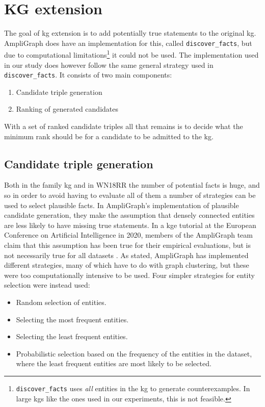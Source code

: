 


\newpage

\section{KG extension}

The goal of \gls{kg} extension is to add potentially true statements to the original \gls{kg}. AmpliGraph does have an implementation for this, called \texttt{discover\_facts}, but due to computational limitations\footnote{\texttt{discover\_facts} uses \textit{all} entities in the \gls{kg} to generate counterexamples. In large \glspl{kg} like the ones used in our experiments, this is not feasible.} it could not be used.
The implementation used in our study does however follow the same general strategy used in \texttt{discover\_facts}. It consists of two main components:
\begin{enumerate}
    \item Candidate triple generation
    \item Ranking of generated candidates
\end{enumerate}
With a set of ranked candidate triples all that remains is to decide what the minimum rank should be for a candidate to be admitted to the \gls{kg}.


\subsection{Candidate triple generation}
\label{canidate_triple_generation}
Both in the family \gls{kg} and in WN18RR the number of potential facts is huge, and so in order to avoid having to evaluate all of them a number of strategies can be used to select plausible facts. In AmpliGraph's implementation of plausible candidate generation, they make the assumption that densely connected entities are less likely to have missing true statements. In a \gls{kge} tutorial at the European Conference on Artificial Intelligence in 2020, members of the AmpliGraph team claim that this assumption has been true for their empirical evaluations, but is not necessarily true for all datasets \cite{kge_tutorial}.  As stated, AmpliGraph has implemented different strategies, many of which have to do with graph clustering, but these were too computationally intensive to be used. Four simpler strategies for entity selection were instead used:
\begin{itemize}
    \item Random selection of entities.
    \item Selecting the most frequent entities.
    \item Selecting the least frequent entities.
    \item Probabilistic selection based on the frequency of the entities in the dataset, where the least frequent entities are most likely to be selected.
\end{itemize}

